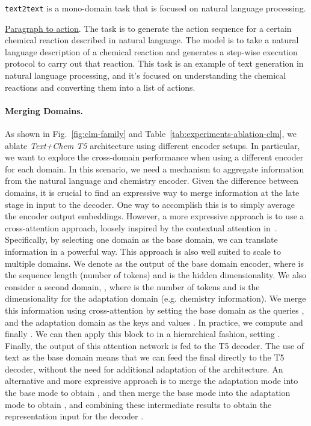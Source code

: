 \documentclass[nohyperref]{article}
\theoremstyle{plain}
\theoremstyle{definition}
\theoremstyle{remark}
\begin{document}
 \texttt{text2text} is a mono-domain task that is focused on natural language processing.

\underline{Paragraph to action}. The task is to generate the action sequence for a certain chemical reaction described in natural language. The model is to take a natural language description of a chemical reaction and generates a step-wise execution protocol to carry out that reaction. This task is an example of text generation in natural language processing, and it's focused on understanding the chemical reactions and converting them into a list of actions.


\paragraph{Merging Domains.}
As shown in Fig.~\ref{fig:clm-family} and Table~\ref{tab:experiments-ablation-clm}, we ablate \emph{Text+Chem T5}  architecture using different encoder setups. In particular, we want to explore the cross-domain performance when using a different encoder for each domain. In this scenario, we need a mechanism to aggregate information from the natural language and chemistry encoder. 
Given the difference between domains, it is crucial to find an expressive way to merge information at the late stage in input to the decoder.
One way to accomplish this is to simply average the encoder output embeddings.
However, a more expressive approach is to use a cross-attention approach, loosely inspired by the contextual attention in~\citet{born2021data}. Specifically, by selecting one domain as the base domain, we can translate information in a powerful way. This approach is also well suited to scale to multiple domains.
We denote  as the output of the base domain encoder, where  is the sequence length (number of tokens) and  is the hidden dimensionality. We also consider a second domain, , where  is the number of tokens and  is the dimensionality for the adaptation domain (e.g. chemistry information).
We merge this information using cross-attention by setting the base domain as the queries 
, and the adaptation domain as the keys 
 and values .
In practice, we compute  and finally .
We can then apply this block to  in a hierarchical fashion, setting . Finally, the output of this attention network is fed to the T5 decoder. The use of text as the base domain means that we can feed the final  directly to the T5 decoder, without the need for additional adaptation of the architecture.
An alternative and more expressive approach is to merge the adaptation mode into the base mode to obtain , and then merge the base mode into the adaptation mode to obtain , and combining these intermediate results to obtain the representation input for the decoder . 
\end{document}
